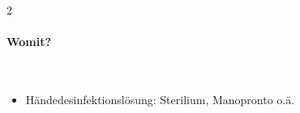 \begin{gWideParEnv}
\begin{multicols}{2}
\begin{minipage}{\linewidth}
\paragraph{Womit?}~
\begin{itemize}
    \item Händedesinfektionslösung:
    Sterilium\texttrademark{}, Manopronto\texttrademark{}
    o.ä.
\end{itemize}
\end{minipage}
\end{multicols}
\end{gWideParEnv}
% 

